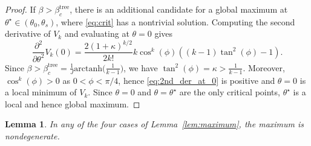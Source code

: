 \documentclass{article}
\numberwithin{theorem}{section}
\newtheorem{lemma}[theorem]{Lemma}
\theoremstyle{remark}
\begin{document}
\begin{proof}
  If $\beta > \beta_c^\mathrm{tree}$, there is an additional candidate 
  for a global maximum at $\theta^\star \in (\theta_0,\theta_s)$, where \eqref{eq:crit} has a nontrivial solution.
  Computing the second derivative of $V_k$ and evaluating at $\theta=0$ gives
  \begin{equation}
      \label{eq:2nd_der_at_0}
      \frac{\partial^2}{\partial \theta^2} V_k(0) = \frac{2(1+\kappa)^{k/2}}{2 k!} k \cos^k(\phi) \left( (k-1) \tan^2(\phi) - 1 \right).
  \end{equation}
  Since $\beta > \beta_c^{\text{tree}} = \frac{1}{J}\mathrm{arctanh} \big(\tfrac{1}{k-1}\big)$, we have $\tan^2(\phi) = \kappa > \frac{1}{k-1}$. Moreover, $\cos^k(\phi) > 0$ as $0<\phi<\pi/4$, hence \eqref{eq:2nd_der_at_0} is positive and $\theta=0$ is a local minimum of $V_k$. Since $\theta=0$ and $\theta=\theta^\star$ are the only critical points, $\theta^\star$ is a local and hence global maximum.
\end{proof}


\begin{lemma}
  \label{lem:nondegenerate}
  In any of the four cases of Lemma~\ref{lem:maximum}, the maximum is nondegenerate.
\end{lemma}
\end{document}
